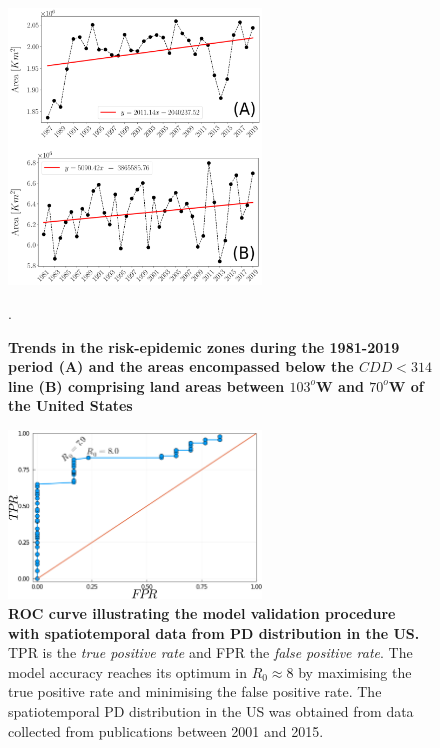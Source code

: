 \begin{figure}[H]
    \centering
    \includegraphics[width=0.6\textwidth]{Figures/CDD_risk_evol_USA.png}
    \caption{\textbf{Trends in the risk-epidemic zones during the 1981-2019
            period (A) and the areas encompassed below the $CDD < 314$ line (B)
            comprising
            land areas between $103^o$W and $70^o$W of the United States}}.
    \label{fig:sup_CDD_evol} %
\end{figure}

\begin{figure}[H]
    \centering
    \includegraphics[width=0.6\textwidth]{Figures/ROC_curve.png}
    \caption{\textbf{ROC curve illustrating the model validation procedure
            with spatiotemporal data from PD distribution in the US.} TPR is
        the
        \textit{true positive rate} and FPR the \textit{false positive rate}.
        The model
        accuracy reaches its optimum in $R_0\approx8$ by maximising the true
        positive
        rate and minimising the false positive rate. The spatiotemporal PD
        distribution
        in the US was obtained from data collected from publications between
        2001 and
        2015.}
    \label{fig:sup_ROC} %
\end{figure}

